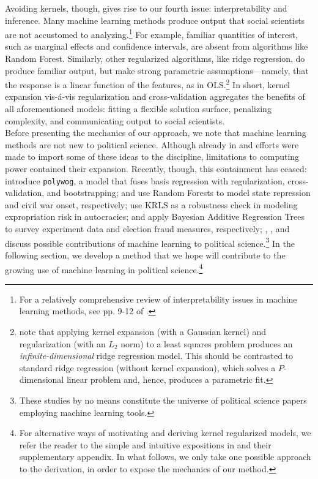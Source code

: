 \documentclass[12pt]{article}
\begin{document}
Avoiding kernels, though, gives rise to our fourth issue: interpretability and inference. Many machine learning methods produce output that social scientists are not accustomed to analyzing.\footnote{For a relatively comprehensive review of interpretability issues in machine learning methods, see pp. 9-12 of \cite{Hainmueller2013}.} For example, familiar quantities of interest, such as marginal effects and confidence intervals, are absent from algorithms like Random Forest. Similarly, other regularized algorithms, like ridge regression, do produce familiar output, but make strong parametric assumptions---namely, that the response is a linear function of the features, as in OLS.\footnote{\cite{Hainmueller2013} note that applying kernel expansion (with a Gaussian kernel) and regularization (with an $L_2$ norm) to a least squares problem produces an \textit{infinite-dimensional} ridge regression model. This should be contrasted to standard ridge regression (without kernel expansion), which solves a $P$-dimensional linear problem and, hence, produces a parametric fit.} In short, kernel expansion vis-\'a-vis regularization and cross-validation aggregates the benefits of all aforementioned models: fitting a flexible solution surface, penalizing complexity, and communicating output to social scientists. 		\\

Before presenting the mechanics of our approach, we note that machine learning methods are not new to political science. Although already in \cite{Beck1998} and \cite{Beck2000} efforts were made to import some of these ideas to the discipline, limitations to computing power contained their expansion. Recently, though, this containment has ceased: \cite{Kenkel2013} introduce \texttt{polywog}, a model that fuses basis regression with regularization, cross-validation, and bootstrapping; \cite{Hill2014} and \cite{Muchlinski2016} use Random Forests to model state repression and civil war onset, respectively; \cite{Wilson2015} use KRLS as a robustness check in modeling expropriation risk in autocracies; \cite{Green2012} and \cite{Montgomery2015} apply Bayesian Additive Regression Trees to survey experiment data and election fraud measures, respectively; \cite{Montgomery2015a}, \cite{Fariss2015}, and \cite{Jones2015} discuss possible contributions of machine learning to political science.\footnote{These studies by no means constitute the universe of political science papers employing machine learning tools.} In the following section, we develop a method that we hope will contribute to the growing use of machine learning in political science.\footnote{For alternative ways of motivating and deriving kernel regularized models, we refer the reader to the simple and intuitive expositions in \cite{Hainmueller2013} and their supplementary appendix. In what follows, we only take one possible approach to the derivation, in order to expose the mechanics of our method.}
\end{document}
